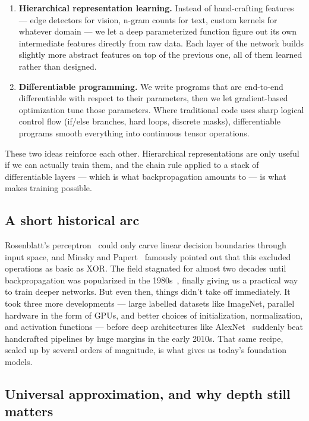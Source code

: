 \documentclass[11pt, a4paper]{article}
\begin{document}
\begin{enumerate}[leftmargin=*]
    \item \textbf{Hierarchical representation learning.} Instead of hand-crafting features --- edge detectors for vision, n-gram counts for text, custom kernels for whatever domain --- we let a deep parameterized function figure out its own intermediate features directly from raw data. Each layer of the network builds slightly more abstract features on top of the previous one, all of them learned rather than designed.
    \item \textbf{Differentiable programming.} We write programs that are end-to-end differentiable with respect to their parameters, then we let gradient-based optimization tune those parameters. Where traditional code uses sharp logical control flow (if/else branches, hard loops, discrete masks), differentiable programs smooth everything into continuous tensor operations.
\end{enumerate}

These two ideas reinforce each other. Hierarchical representations are only useful if we can actually train them, and the chain rule applied to a stack of differentiable layers --- which is what backpropagation amounts to --- is what makes training possible.

\subsection{A short historical arc}

Rosenblatt's perceptron~\cite{rosenblatt1958} could only carve linear decision boundaries through input space, and Minsky and Papert~\cite{minsky1969} famously pointed out that this excluded operations as basic as XOR. The field stagnated for almost two decades until backpropagation was popularized in the 1980s~\cite{rumelhart1986}, finally giving us a practical way to train deeper networks. But even then, things didn't take off immediately. It took three more developments --- large labelled datasets like ImageNet, parallel hardware in the form of GPUs, and better choices of initialization, normalization, and activation functions --- before deep architectures like AlexNet~\cite{krizhevsky2012} suddenly beat handcrafted pipelines by huge margins in the early 2010s. That same recipe, scaled up by several orders of magnitude, is what gives us today's foundation models.

\subsection{Universal approximation, and why depth still matters}
\end{document}
